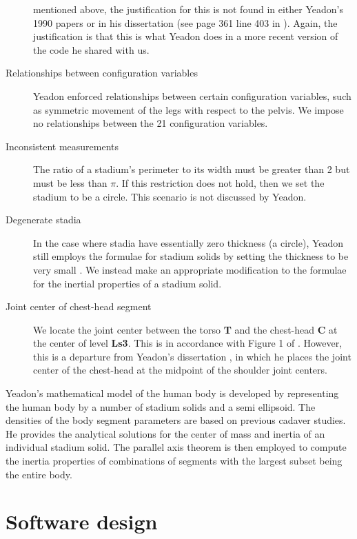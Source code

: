 \documentclass[10pt]{article}
\begin{document}
\begin{description}
        mentioned above, the justification for this is not found in either
        Yeadon's 1990 papers or in his dissertation (see page 361 line 403 in
        \cite{Yeadon1984a}). Again, the justification is that this is what
        Yeadon does in a more recent version of the code he shared with us.
    \item[Relationships between configuration variables] Yeadon enforced
        relationships between certain configuration variables, such as
        symmetric movement of the legs with respect to the pelvis. We impose no
        relationships between the 21 configuration variables.
    \item[Inconsistent measurements] The ratio of a stadium's perimeter to its
        width must be greater than 2 but must be less than $\pi$. If this
        restriction does not hold, then we set the stadium to be a circle. This
        scenario is not discussed by Yeadon.
    \item[Degenerate stadia] In the case where stadia have essentially zero
        thickness (a circle), Yeadon still employs the formulae for stadium
        solids by setting the thickness to be very small \cite{Yeadon1990f}. We
        instead make an appropriate modification to the formulae for the
        inertial properties of a stadium solid.
    \item[Joint center of chest-head segment] We locate the joint center
        between the torso \textbf{T} and the chest-head \textbf{C} at the
        center of level \textbf{Ls3}. This is in accordance with Figure 1 of
        \cite{Yeadon1990e}. However, this is a departure from Yeadon's
        dissertation \cite{Yeadon1984a}, in which he places the joint center of
        the chest-head at the midpoint of the shoulder joint centers.
\end{description}

Yeadon's mathematical model of the human body is developed by representing the
human body by a number of stadium solids and a semi ellipsoid. The densities of the
body segment parameters are based on previous cadaver studies. He provides the
analytical solutions for the center of mass and inertia of an individual
stadium solid. The parallel axis theorem is then employed to compute the
inertia properties of combinations of segments with the largest subset being
the entire body.

\section*{Software design}
\end{document}
